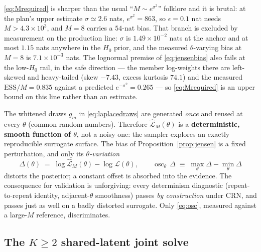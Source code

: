 \noindent \eqref{eq:Mrequired} is sharper than the usual ``$M\sim e^{\sigma^2}$''
folklore and it is brutal: at the plan's upper estimate $\sigma\simeq2.6$ nats,
$e^{\sigma^2}=863$, so $\epsilon=0.1$ nat needs $M>4.3\times10^3$, and $M=8$
carries a $54$-nat bias.  That branch is excluded by measurement on the
production line: $\sigma$ is $1.49\times10^{-2}$ nats at the anchor and at most
$1.15$ nats anywhere in the $H_0$ prior, and the measured $\theta$-varying bias at
$M=8$ is $7.1\times10^{-3}$ nats.  The lognormal premise of
\eqref{eq:jensenbias} also fails at the low-$H_0$ rail, in the safe direction ---
the member log-weights there are left-skewed and heavy-tailed (skew $-7.43$,
excess kurtosis $74.1$) and the measured $\mathrm{ESS}/M=0.835$ against a
predicted $e^{-\sigma^2}=0.265$ --- so \eqref{eq:Mrequired} is an upper bound on
this line rather than an estimate.

\begin{remark}
\label{rem:crn}
The whitened draws $g_m$ in \eqref{eq:laplacedraws} are generated \emph{once}
and reused at every $\theta$ (common random numbers).  Therefore
$\widehat{\mathcal L}_M(\theta)$ is a \textbf{deterministic, smooth function of
$\theta$}, not a noisy one: the sampler explores an exactly reproducible
surrogate surface.  The bias of Proposition~\ref{prop:jensen} is a fixed
perturbation, and only its \emph{$\theta$-variation}
\begin{equation}
  \Delta(\theta)\;=\;\log\widehat{\mathcal L}_M(\theta)-\log\mathcal L(\theta),
  \qquad
  \mathop{\mathrm{osc}}_\theta\,\Delta\;\equiv\;
  \max_\theta\Delta-\min_\theta\Delta
  \label{eq:osc}
\end{equation}
distorts the posterior; a constant offset is absorbed into the evidence.  The
consequence for validation is unforgiving: every determinism diagnostic
(repeat-to-repeat identity, adjacent-$\theta$ smoothness) passes
\emph{by construction} under CRN, and passes just as well on a badly distorted
surrogate.  Only \eqref{eq:osc}, measured against a large-$M$ reference,
discriminates.
\end{remark}

\subsection{The $K\ge2$ shared-latent joint solve}

